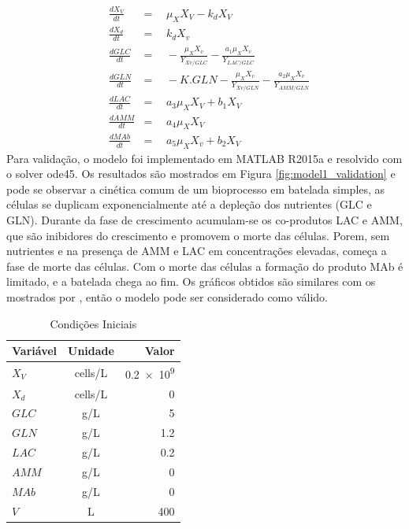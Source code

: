 \documentclass[fleqn,10pt]{SelfArx} %
\begin{document}
\begin{subequations} \label{eq:EDO}
	\begin{align}
	&\frac{dX_V}{dt}\!\!\!\!\!\!\!\!\!\!&=& \;\, \mu _X X_V -k_d X_V \label{eq:EDOa}
	\\
	&\frac{dX_d}{dt}\!\!\!\!\!\!\!\!\!\!&=& \;\, k_d X_v \label{eq:EDOb}
	\\
	&\frac{dGLC}{dt}\!\!\!\!\!\!\!\!\!\!&=& \;\, -\frac{\mu _X X_v}{Y_{Xv/GLC}}-\frac{a_1 \mu _X X_v}{Y_{LAC/GLC}} \label{eq:EDOc}
	\\
	&\frac{dGLN}{dt}\!\!\!\!\!\!\!\!\!\!&=& \;\, -K.GLN -\frac{\mu _X X_v}{Y_{Xv/GLN}}-\frac{a_2 \mu _X X_v}{Y_{AMM/GLN}} \label{eq:EDOd}
	\\
	&\frac{dLAC}{dt}\!\!\!\!\!\!\!\!\!\!&=& \;\, a_3 \mu _X X_V + b_1 X_V \label{eq:EDOe}
	\\
	&\frac{dAMM}{dt}\!\!\!\!\!\!\!\!\!\!&=& \;\, a_4 \mu _X X_V \label{eq:EDOf}
	\\
	&\frac{dMAb}{dt}\!\!\!\!\!\!\!\!\!\!&=& \;\, a_5 \mu _X X_v+b_2 X_V \label{eq:EDOg}
	\end{align}	
\end{subequations}
Para validação, o modelo foi implementado em MATLAB R2015a e resolvido com o solver ode45. Os resultados são mostrados em Figura \ref{fig:model1_validation} e pode se observar a cinética comum de um bioprocesso em batelada simples, as células se duplicam exponencialmente até a depleção dos nutrientes (GLC e GLN). Durante da fase de crescimento acumulam-se os co-produtos LAC e AMM, que são inibidores do crescimento e promovem o morte das células. Porem, sem nutrientes e na presença de AMM e LAC em concentrações elevadas, começa a fase de morte das células. Com o morte das células a formação do produto MAb é limitado, e a batelada chega ao fim. Os gráficos obtidos são similares com os mostrados por \cite{Alves2008}, então o modelo pode ser considerado como válido.

\begin{table}
	\caption{Condições Iniciais}
	\centering
	\begin{tabular}{lcr}
		\toprule
		Variável & Unidade & Valor \\
		\midrule
		$X_V$ & \si{cells/L} & \num{0.2e9} \\
		$X_d$ & \si{cells/L} & \num{0} \\
		$GLC$ & \si{g/L} & \num{5} \\
		$GLN$ & \si{g/L} & \num{1.2} \\
		$LAC$ & \si{g/L} & \num{0.2} \\
		$AMM$ & \si{g/L} & \num{0} \\
		$MAb$ & \si{g/L} & \num{0} \\
		$V$ & \si{L} & \num{400} \\
	\end{tabular}
	\label{tab:initial}
\end{table}
\end{document}
